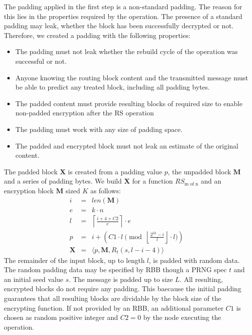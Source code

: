 \documentclass[acmsmall, screen, review]{acmart}
\begin{document}
The padding applied in the first step is a non-standard padding. The reason for this lies in the properties required by the operation. The presence of a standard padding may leak, whether the block has been successfully decrypted or not. Therefore, we created a padding with the following properties:
\begin{itemize}
	\item The padding must not leak whether the rebuild cycle of the operation was successful or not.
	\item Anyone knowing the routing block content and the transmitted message must be able to predict any treated block, including all padding bytes.
	\item The padded content must provide resulting blocks of required size to enable non-padded encryption after the RS operation
	\item The padding must work with any size of padding space.
	\item The padded and encrypted block must not leak an estimate of the original content.
\end{itemize}

The padded block $\mathbf{X}$ is created from a padding value $p$, the unpadded block $\mathbf{M}$ and a series of padding bytes. We build $\mathbf{X}$ for a function $RS_{\text{m of n}}$ and an encryption block $\mathbf{M}$ sized $K$ as follows:
\begin{eqnarray}
i          & = & len(\mathbf{M})\\
e          & = & k \cdot n\\
l          & = & \left\lceil\frac{i + 4 + C2 }{e}\right\rceil\cdot e\\
p          & = & i + \left( C1 \cdot l \pmod{\left\lfloor\frac{2^{32}-i}{l}\right\rfloor\cdot l}\right)\\
\mathbf{X} & = & \langle p,\mathbf{M},R_{t}\left(s,l-i-4\right)\rangle
\end{eqnarray}    
The remainder of the input block, up to length $l$, is padded with random data. The random padding data may be specified by RBB though a PRNG spec $t$ and an initial seed value $s$. The message is padded up to size $L$. All resulting, encrypted blocks do not require any padding. This baecause the initial padding guarantees that all resulting blocks are dividable by the block size of the encrypting function. If not provided by an RBB, an additional parameter $C1$ is chosen as random positive integer and $C2=0$  by the node executing the operation.
\end{document}
